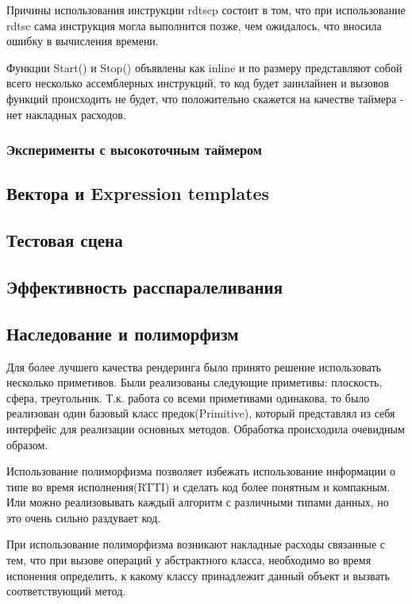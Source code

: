 \documentclass[12pt, a4paper]{article}
\begin{document}
Причины использования инструкции rdtscp состоит в том, что при использование rdtsc сама инструкция могла выполнится позже, чем ожидалось, что вносила ошибку в вычисления времени.

Функции Start() и Stop() объявлены как inline и по размеру представляют собой всего несколько ассемблерных инструкций, то код будет заинлайнен и вызовов функций происходить не будет, что положительно скажется на качестве таймера - нет накладных расходов.



\subsubsection{Эксперименты с высокоточным таймером}

\subsection{Вектора и Expression templates}

\subsection{Тестовая сцена}

\subsection{Эффективность расспаралеливания}

\subsection{Наследование и полиморфизм}

Для более лучшего качества рендеринга было принято решение использовать несколько приметивов. Были реализованы следующие приметивы: плоскость, сфера, треугольник. Т.к. работа со всеми приметивами одинакова, то было реализован один базовый класс предок(Primitive), который представлял из себя интерфейс для реализации основных методов. Обработка происходила очевидным образом. 

Использование полиморфизма позволяет избежать использование информации о типе во время исполнения(RTTI) и сделать код более понятным и компакным. Или можно реализовывать каждый алгоритм с различными типами данных, но это очень сильно раздувает код.

При использование полиморфизма возникают накладные расходы связанные с тем, что при вызове операций у абстрактного класса, необходимо во время испонения определить, к какому классу принадлежит данный объект и вызвать соответствующий метод. 
\end{document}
